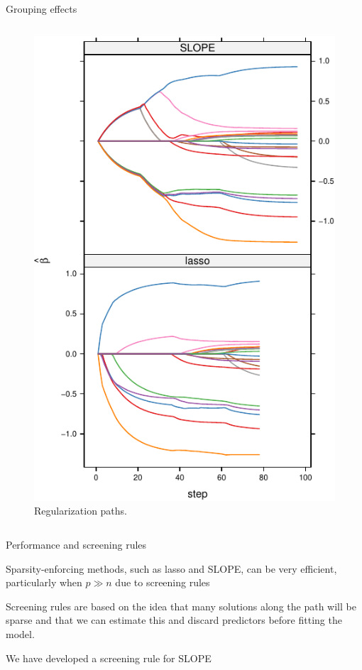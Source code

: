 \documentclass[10pt]{beamer}
\begin{document}
\begin{frame}{Grouping effects}
\begin{columns}
\begin{column}{0.45\linewidth}
\begin{figure}
        \includegraphics[width=0.9\linewidth]{figures/grouping-effect.pdf}
        \caption{Regularization paths.}
    \end{figure}
\end{column}
\end{columns}
\end{frame}

\begin{frame}{Performance and screening rules}

Sparsity-enforcing methods, such as lasso and SLOPE, can be \alert{very efficient}, particularly when \(p \gg n\) due to \alert{screening rules}\medskip

Screening rules are based on the idea that many solutions along the path will be sparse and that we can estimate this and \alert{discard} predictors before fitting the model.\medskip

We have developed a screening rule for SLOPE~\autocite{larsson2020b}

\end{frame}
\end{document}
